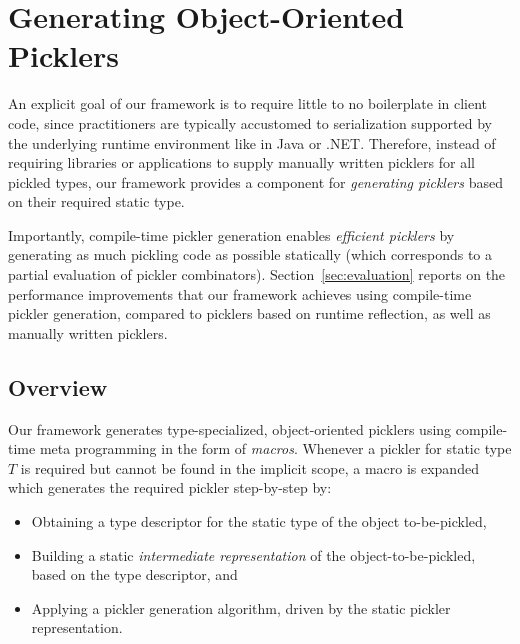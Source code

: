 \documentclass[preprint,10pt]{sigplanconf}
\theoremstyle{definition}
\theoremstyle{definition}
\begin{document}
\section{Generating Object-Oriented Picklers}
\label{sec:generation}

An explicit goal of our framework is to require little to no boilerplate in
client code, since practitioners are typically accustomed to serialization supported
by the underlying runtime environment like in Java or .NET. Therefore, instead
of requiring libraries or applications to supply manually written picklers for
all pickled types, our framework provides a component for {\em generating picklers}
based on their required static type.

Importantly, compile-time pickler generation enables {\em efficient picklers}
by generating as much pickling code as possible statically (which corresponds
to a partial evaluation of pickler combinators). Section~\ref{sec:evaluation}
reports on the performance improvements that our framework achieves using
compile-time pickler generation, compared to picklers based on runtime
reflection, as well as manually written picklers.


\subsection{Overview}

Our framework generates type-specialized, object-oriented picklers using
compile-time meta programming in the form of {\em macros}. Whenever
a pickler for static type $T$ is required but cannot be found in the implicit
scope, a macro is expanded which generates the required pickler step-by-step
by:

\begin{itemize}
\item Obtaining a type descriptor for the static type of the object to-be-pickled,

\item Building a static {\em intermediate representation} of the object-to-be-pickled,
based on the type descriptor, and

\item Applying a pickler generation algorithm, driven by the static pickler
representation.
\end{itemize}
\end{document}
